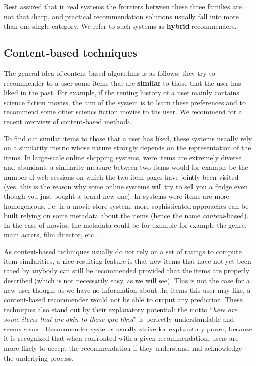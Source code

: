 Rest assured that in real systems the frontiers between these three families
are not that sharp, and practical recommendation solutions usually fall into
more than one single category. We refer to such systems as \textbf{hybrid}
recommenders.

\subsection{Content-based techniques}

The general idea of content-based algorithms is as follows: they try to recommender to a user some items that are
\textbf{similar} to those that the user has liked in the past. For example, if
the renting history of a user mainly contains science fiction movies, the aim
of the system is to learn these preferences and to recommend some other science
fiction movies to the user. We recommend \cite{LopGemSem11} for a recent
overview of content-based methods.

To find out similar items to those that a user has liked, these systems usually
rely on a similarity metric whose nature strongly depends on the representation
of the items. In large-scale online shopping systems, were items are extremely
diverse and abundant, a similarity measure between two items would for
example be the number of web sessions on which the two item pages have jointly
been visited (yes, this is the reason why some online systems will try to sell
you a fridge even though you just bought a brand new one). In systems were
items are more homogeneous, i.e. in a movie store system, more  sophisticated
approaches can be built relying on some metadata about the items (hence the
name \textit{content}-based). In the case of movies, the metadata could be for
example for example the genre, main actors, film director, etc\dots

As content-based techniques usually do not rely on a set of ratings to compute item
similarities, a nice resulting feature is that new items that have not yet been
rated by anybody can still be recommended provided that the items are properly
described (which is not necessarily easy, as we will see). This is not the case for a new user
though: as we have no information about the items this user may like, a
content-based recommender would not be able to output any prediction. These
techniques also stand out by their explanatory potential: the motto
``\textit{here are some items that are akin to those you liked}'' is perfectly
understandable and seems sound.  Recommender systems usually strive for
explanatory power, because it is recognized that when confronted with a given
recommendation, users are more likely to accept the recommendation if they
understand and acknowledge the underlying process.

